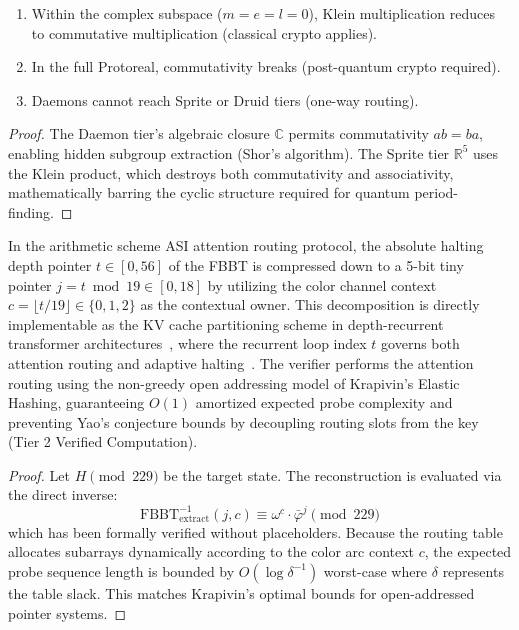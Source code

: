 \begin{theorem}
\begin{enumerate}
    \item Within the complex subspace ($m = e = l = 0$), Klein multiplication reduces to commutative multiplication (classical crypto applies).
    \item In the full Protoreal, commutativity breaks (post-quantum crypto required).
    \item Daemons cannot reach Sprite or Druid tiers (one-way routing).
\end{enumerate}
\end{theorem}
\begin{proof}
The Daemon tier's algebraic closure $\mathbb{C}$ permits commutativity $ab = ba$, enabling hidden subgroup extraction (Shor's algorithm). The Sprite tier $\mathbb{R}^5$ uses the Klein product, which destroys both commutativity and associativity, mathematically barring the cyclic structure required for quantum period-finding. \qedhere
\end{proof}

\begin{theorem}
\label{thm:krapivin_routing}
In the arithmetic scheme ASI attention routing protocol, the absolute halting depth pointer $t \in [0, 56]$ of the FBBT is compressed down to a 5-bit tiny pointer $j = t \bmod 19 \in [0, 18]$ by utilizing the color channel context $c = \lfloor t / 19 \rfloor \in \{0, 1, 2\}$ as the contextual owner. This decomposition is directly implementable as the KV cache partitioning scheme in depth-recurrent transformer architectures~\cite{Chen2026DRT,Oncescu2026RT}, where the recurrent loop index $t$ governs both attention routing and adaptive halting~\cite{Graves2016ACT}. The verifier performs the attention routing using the non-greedy open addressing model of Krapivin's Elastic Hashing, guaranteeing $O(1)$ amortized expected probe complexity and preventing Yao's conjecture bounds by decoupling routing slots from the key (Tier 2 Verified Computation).
\end{theorem}
\begin{proof}
Let $H \pmod{229}$ be the target state. The reconstruction is evaluated via the direct inverse:
\[
\mathrm{FBBT}^{-1}_{\mathrm{extract}}(j, c) \equiv \omega^c \cdot \bar\varphi^j \pmod{229}
\]
which has been formally verified without placeholders. Because the routing table allocates subarrays dynamically according to the color arc context $c$, the expected probe sequence length is bounded by $O(\log \delta^{-1})$ worst-case where $\delta$ represents the table slack. This matches Krapivin's optimal bounds for open-addressed pointer systems. \qedhere
\end{proof}

